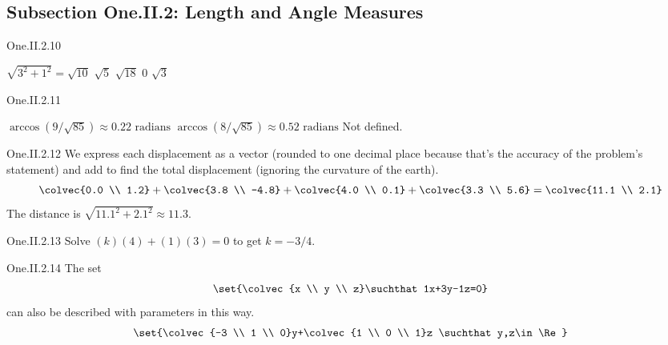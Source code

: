 \subsection{Subsection One.II.2: Length and Angle Measures}
\begin{ans}{One.II.2.10}
      \begin{exparts*}
        \partsitem \( \sqrt{3^2+1^2}=\sqrt{10}  \)
        \partsitem \( \sqrt{5}  \)
        \partsitem \( \sqrt{18}  \)
        \partsitem \( 0  \)
        \partsitem \( \sqrt{3}  \)
      \end{exparts*}
    
\end{ans}
\begin{ans}{One.II.2.11}
       \begin{exparts*}
         \partsitem \( \arccos(9/\sqrt{85})\approx 0.22\mbox{\ radians} \)
         \partsitem \( \arccos(8/\sqrt{85})\approx 0.52\mbox{\ radians} \)
         \partsitem Not defined.
      \end{exparts*}
     
\end{ans}
\begin{ans}{One.II.2.12}
      We express each displacement as a vector (rounded to one
      decimal place because that's the accuracy of the problem's statement)
      and add to find the total displacement
      (ignoring the curvature of the earth).
      \begin{equation*}
        \colvec{0.0 \\ 1.2}
        +\colvec{3.8 \\ -4.8}
        +\colvec{4.0 \\ 0.1}
        +\colvec{3.3 \\ 5.6}
        =\colvec{11.1 \\ 2.1}
      \end{equation*}
      The distance is \( \sqrt{11.1^2+2.1^2}\approx 11.3 \).
    
\end{ans}
\begin{ans}{One.II.2.13}
       Solve \( (k)(4)+(1)(3)=0 \) to get \( k=-3/4 \).
    
\end{ans}
\begin{ans}{One.II.2.14}
      The set
      \begin{equation*}
         \set{\colvec{x \\ y \\ z}\suchthat 1x+3y-1z=0}
      \end{equation*}
      can also be described with parameters in this way.
      \begin{equation*}
         \set{\colvec{-3 \\ 1 \\ 0}y+\colvec{1 \\ 0 \\ 1}z
               \suchthat y,z\in\Re}
      \end{equation*}
    
\end{ans}
